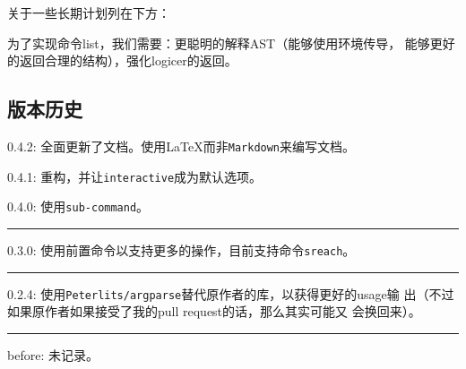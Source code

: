 \documentclass{peterlitsdoc}
\begin{document}
关于一些长期计划列在下方：

为了实现命令list，我们需要：更聪明的解释AST（能够使用环境传导，
能够更好的返回合理的结构），强化logicer的返回。

\subsection{版本历史}

\def\hline{\begingroup
    \noindent\pltgray\rule{\textwidth}{0.5pt}%
    \endgroup}

0.4.2: 全面更新了文档。使用\LaTeX{}而非\verb|Markdown|来编写文档。

0.4.1: 重构，并让\verb|interactive|成为默认选项。

0.4.0: 使用\verb|sub-command|。

\hline

0.3.0: 使用前置命令以支持更多的操作，目前支持命令\verb|sreach|。

\hline

0.2.4: 使用\verb|Peterlits/argparse|替代原作者的库，以获得更好的usage输
出（不过如果原作者如果接受了我的pull request的话，那么其实可能又
会换回来）。

\hline

before: 未记录。
\end{document}
